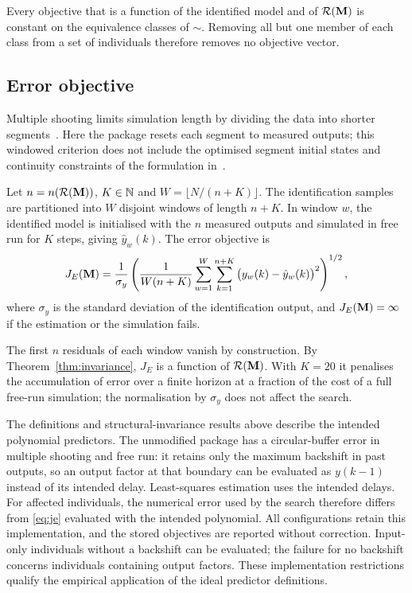 \begin{corollary}\label{cor:classes}
Every objective that is a function of the identified model and of $\mathcal{R}(\mathbf{M})$ is constant on the equivalence classes
of $\sim$. Removing all but one member of each class from a set of individuals therefore removes no objective vector.
\end{corollary}

\subsection{Error objective}
Multiple shooting limits simulation length by dividing the data into shorter segments~\cite{Ribeiro2020}. Here the package resets each segment to measured outputs; this windowed criterion does not include the optimised segment initial states and continuity constraints of the formulation in~\cite{Ribeiro2020}.

\begin{definition}\label{def:je}
Let $n=n(\mathcal{R}(\mathbf{M}))$, $K\in\mathbb{N}$ and $W=\lfloor N/(n+K)\rfloor$. The identification samples are partitioned into $W$
disjoint windows of length $n+K$. In window $w$, the identified model is initialised with the $n$ measured outputs
and simulated in free run for $K$ steps, giving $\hat y_w(k)$. The error objective is
\begin{equation}
J_E(\mathbf{M})=\frac{1}{\sigma_y}\left(\frac{1}{W(n+K)}\sum_{w=1}^{W}\sum_{k=1}^{n+K}\big(y_w(k)-\hat y_w(k)\big)^2\right)^{1/2},
\label{eq:je}
\end{equation}
where $\sigma_y$ is the standard deviation of the identification output, and $J_E(\mathbf{M})=\infty$ if the estimation or
the simulation fails.
\end{definition}

The first $n$ residuals of each window vanish by construction. By Theorem~\ref{thm:invariance}, $J_E$ is a function
of $\mathcal{R}(\mathbf{M})$. With $K=20$ it penalises the accumulation of error over a finite horizon at a fraction of the cost of a
full free-run simulation; the normalisation by $\sigma_y$ does not affect the search.

The definitions and structural-invariance results above describe the intended polynomial predictors. The unmodified package has a circular-buffer error in multiple shooting and free run: it retains only the maximum backshift in past outputs, so an output factor at that boundary can be evaluated as $y(k-1)$ instead of its intended delay. Least-squares estimation uses the intended delays. For affected individuals, the numerical error used by the search therefore differs from \eqref{eq:je} evaluated with the intended polynomial. All configurations retain this implementation, and the stored objectives are reported without correction. Input-only individuals without a backshift can be evaluated; the failure for no backshift concerns individuals containing output factors. These implementation restrictions qualify the empirical application of the ideal predictor definitions.

